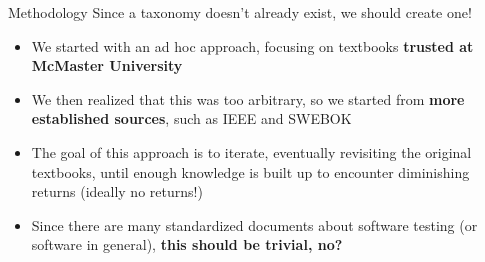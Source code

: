 \documentclass[22pt]{beamer}
\begin{document}
\begin{frame}[fragile]
\begin{textblock}{7.25}
        \begin{block}{\fontsize{37}{20}\selectfont Methodology}
            Since a taxonomy doesn't already exist, we should create one!
            \begin{itemize}
                \item We started with an ad hoc approach, focusing on
                      textbooks \textbf{trusted at McMaster University}
                \item We then realized that this was too arbitrary, so
                      we started from \textbf{more established sources}, such as
                      IEEE and SWEBOK
                \item The goal of this approach is to iterate,
                      eventually revisiting the original textbooks,
                      until enough knowledge is built up to encounter
                      diminishing returns (ideally no returns!)
                \item Since there are many standardized documents about software
                      testing (or software in general), \textbf{this should be
                          trivial, no?}
            \end{itemize}
            \vspace{5mm}
        \end{block}


\end{textblock}
\end{frame}
\end{document}
